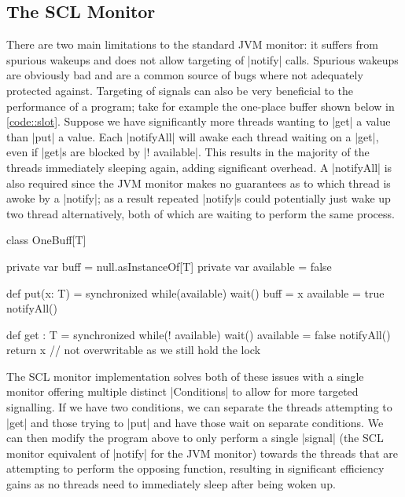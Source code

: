 \subsection{The SCL Monitor}


There are two main limitations to the standard JVM monitor: it suffers from spurious wakeups and does not allow targeting of |notify| calls. Spurious wakeups are obviously bad and are a common source of bugs where not adequately protected against. Targeting of signals can also be very beneficial to the performance of a program; take for example the one-place buffer shown below in \ref{code::slot}. Suppose we have significantly more threads wanting to |get| a value than |put| a value. Each |notifyAll| will awake each thread waiting on a |get|, even if |get|s are blocked by |! available|. This results in the majority of the threads immediately sleeping again, adding significant overhead. A |notifyAll| is also required since the JVM monitor makes no guarantees as to which thread is awoke by a |notify|; as a result repeated |notify|s could potentially just wake up two thread alternatively, both of which are waiting to perform the same process.

\begin{scala}[label=code::slot, caption={Single placed buffer as an example of the inefficiency of untargeted signals}]
  class OneBuff[T] {
    private var buff = null.asInstanceOf[T]
    private var available = false

    def put(x: T) = synchronized {
      while(available) wait()
      buff = x
      available = true
      notifyAll()
    }

    def get : T = synchronized {
      while(! available) wait()
      available = false
      notifyAll()
      return x // not overwritable as we still hold the lock
    }
  }
\end{scala}

The SCL monitor implementation solves both of these issues with a single monitor offering multiple distinct |Conditions| to allow for more targeted signalling. 
If we have two conditions, we can separate the threads attempting to |get| and those trying to |put| and have those wait on separate conditions. We can then modify the program above to only perform a single |signal| (the SCL monitor equivalent of |notify| for the JVM monitor) towards the threads that are attempting to perform the opposing function, resulting in significant efficiency gains as no threads need to immediately sleep after being woken up.

